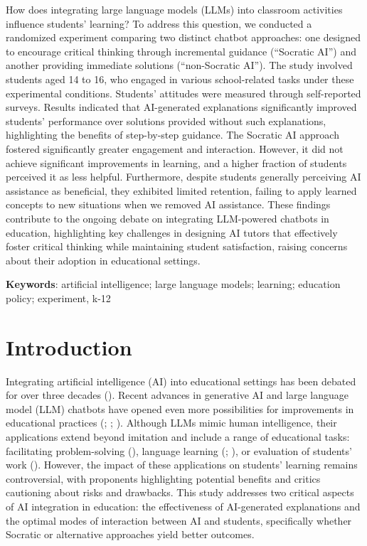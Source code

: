 \documentclass[
  11pt,
]{article}
\begin{document}
How does integrating large language models (LLMs) into classroom activities influence students' learning? To address this question, we conducted a randomized experiment comparing two distinct chatbot approaches: one designed to encourage critical thinking through incremental guidance (``Socratic AI'') and another providing immediate solutions (``non-Socratic AI''). The study involved students aged 14 to 16, who engaged in various school-related tasks under these experimental conditions. Students' attitudes were measured through self-reported surveys. Results indicated that AI-generated explanations significantly improved students' performance over solutions provided without such explanations, highlighting the benefits of step-by-step guidance. The Socratic AI approach fostered significantly greater engagement and interaction. However, it did not achieve significant improvements in learning, and a higher fraction of students perceived it as less helpful. Furthermore, despite students generally perceiving AI assistance as beneficial, they exhibited limited retention, failing to apply learned concepts to new situations when we removed AI assistance. These findings contribute to the ongoing debate on integrating LLM-powered chatbots in education, highlighting key challenges in designing AI tutors that effectively foster critical thinking while maintaining student satisfaction, raising concerns about their adoption in educational settings.

\textbf{Keywords}: artificial intelligence; large language models; learning; education policy; experiment, k-12

\section{Introduction}\label{introduction}

Integrating artificial intelligence (AI) into educational settings has been debated for over three decades (). Recent advances in generative AI and large language model (LLM) chatbots have opened even more possibilities for improvements in educational practices (; ; ). Although LLMs mimic human intelligence, their applications extend beyond imitation and include a range of educational tasks: facilitating problem-solving (), language learning (; ), or evaluation of students' work (). However, the impact of these applications on students' learning remains controversial, with proponents highlighting potential benefits and critics cautioning about risks and drawbacks. This study addresses two critical aspects of AI integration in education: the effectiveness of AI-generated explanations and the optimal modes of interaction between AI and students, specifically whether Socratic or alternative approaches yield better outcomes.
\end{document}
